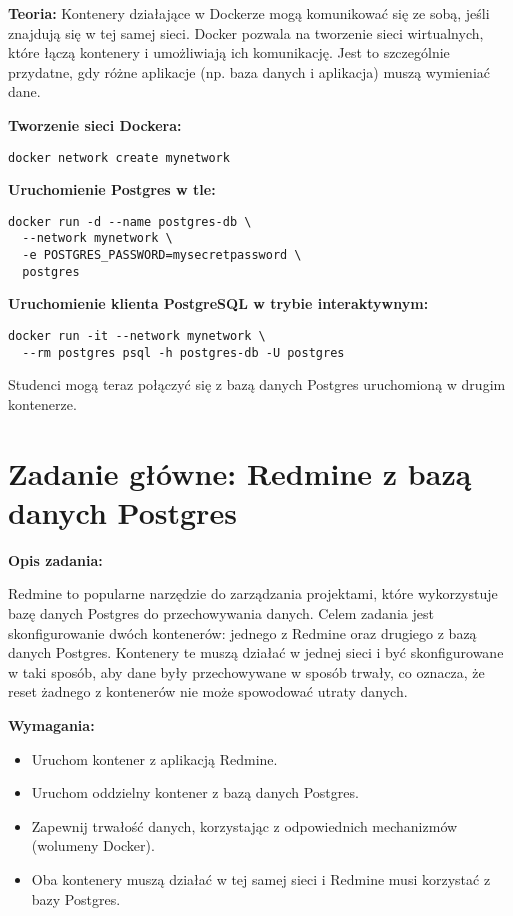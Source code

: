 \documentclass{article}
\begin{document}
\textbf{Teoria:}  
Kontenery działające w Dockerze mogą komunikować się ze sobą, jeśli znajdują się w tej samej sieci. Docker pozwala na tworzenie sieci wirtualnych, które łączą kontenery i umożliwiają ich komunikację. Jest to szczególnie przydatne, gdy różne aplikacje (np. baza danych i aplikacja) muszą wymieniać dane.

\textbf{Tworzenie sieci Dockera:}

\noindent\begin{lstlisting}
docker network create mynetwork
\end{lstlisting}

\textbf{Uruchomienie Postgres w tle:}

\noindent\begin{lstlisting}
docker run -d --name postgres-db \
  --network mynetwork \
  -e POSTGRES_PASSWORD=mysecretpassword \
  postgres
\end{lstlisting}

\textbf{Uruchomienie klienta PostgreSQL w trybie interaktywnym:}

\noindent\begin{lstlisting}
docker run -it --network mynetwork \
  --rm postgres psql -h postgres-db -U postgres
\end{lstlisting}

Studenci mogą teraz połączyć się z bazą danych Postgres uruchomioną w drugim kontenerze.

\section{Zadanie główne: Redmine z bazą danych Postgres}

\textbf{Opis zadania:}

Redmine to popularne narzędzie do zarządzania projektami, które wykorzystuje bazę danych Postgres do przechowywania danych. Celem zadania jest skonfigurowanie dwóch kontenerów: jednego z Redmine oraz drugiego z bazą danych Postgres. Kontenery te muszą działać w jednej sieci i być skonfigurowane w taki sposób, aby dane były przechowywane w sposób trwały, co oznacza, że reset żadnego z kontenerów nie może spowodować utraty danych.

\textbf{Wymagania:}
\begin{itemize}
    \item Uruchom kontener z aplikacją Redmine.
    \item Uruchom oddzielny kontener z bazą danych Postgres.
    \item Zapewnij trwałość danych, korzystając z odpowiednich mechanizmów (wolumeny Docker).
    \item Oba kontenery muszą działać w tej samej sieci i Redmine musi korzystać z bazy Postgres.
\end{itemize}
\end{document}

